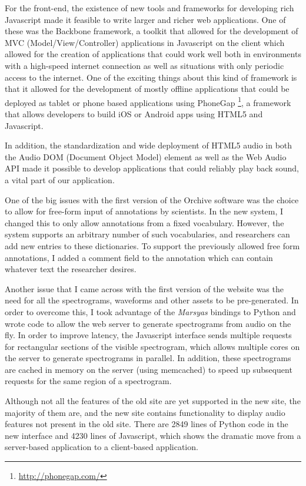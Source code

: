 \documentclass[12pt,oneside]{book}
\begin{document}
For the front-end, the existence of new tools and frameworks for
developing rich Javascript made it feasible to write larger and richer
web applications.  One of these was the Backbone framework, a toolkit
that allowed for the development of MVC (Model/View/Controller)
applications in Javascript on the client which allowed for the
creation of applications that could work well both in environments
with a high-speed internet connection as well as situations with only
periodic access to the internet.  One of the exciting things about
this kind of framework is that it allowed for the development of
mostly offline applications that could be deployed as tablet or phone
based applications using
PhoneGap \footnote{\url{http://phonegap.com/}}, a framework that
allows developers to build iOS or Android apps using HTML5 and
Javascript.

In addition, the standardization and wide deployment of HTML5 audio in
both the Audio DOM (Document Object Model) element as well as the Web
Audio API made it possible to develop applications that could reliably
play back sound, a vital part of our application.

One of the big issues with the first version of the Orchive software
was the choice to allow for free-form input of annotations by
scientists.  In the new system, I changed this to only allow
annotations from a fixed vocabulary.  However, the system supports an
arbitrary number of such vocabularies, and researchers can add new
entries to these dictionaries.  To support the previously allowed free
form annotations, I added a comment field to the annotation which can
contain whatever text the researcher desires.

Another issue that I came across with the first version of the
website was the need for all the spectrograms, waveforms and other
assets to be pre-generated.  In order to overcome this, I took
advantage of the \textit{Marsyas} bindings to Python and wrote code to allow
the web server to generate spectrograms from audio on the fly.  In
order to improve latency, the Javascript interface sends multiple
requests for rectangular sections of the visible spectrogram, which
allows multiple cores on the server to generate spectrograms in
parallel.  In addition, these spectrograms are cached in memory on the
server (using memcached) to speed up subsequent requests for the same
region of a spectrogram.

Although not all the features of the old site are yet supported in the
new site, the majority of them are, and the new site contains
functionality to display audio features not present in the old site.
There are 2849 lines of Python code in the new interface and 4230
lines of Javascript, which shows the dramatic move from a server-based
application to a client-based application.
\end{document}
